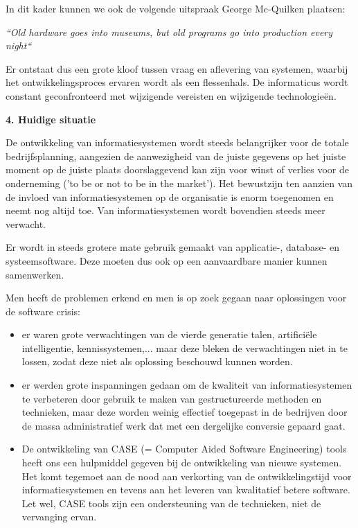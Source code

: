 In dit kader kunnen we ook de volgende uitspraak George Mc-Quilken plaatsen:

\textit{\textquotedblleft Old hardware goes into museums, but old programs go into production every night\textquotedblleft}

Er ontstaat dus een grote kloof tussen vraag en aflevering van systemen, waarbij het ontwikkelingsproces ervaren wordt als een flessenhals. De informaticus wordt constant geconfronteerd met wijzigende vereisten en wijzigende technologieën.

\textbf{4. Huidige situatie}

De ontwikkeling van informatiesystemen wordt steeds belangrijker voor de totale bedrijfsplanning, aangezien de aanwezigheid van de juiste gegevens op het juiste moment op de juiste plaats doorslaggevend kan zijn voor winst of verlies voor de onderneming ('to be or not to be in the market').
Het bewustzijn ten aanzien van de invloed van informatiesystemen op de organisatie is enorm toegenomen en neemt nog altijd toe. Van informatiesystemen wordt bovendien steeds meer verwacht.

Er wordt in steeds grotere mate gebruik gemaakt van applicatie-, database- en systeemsoftware. Deze moeten dus ook op een aanvaardbare manier kunnen samenwerken.

Men heeft de problemen erkend en men is op zoek gegaan naar oplossingen voor de software crisis:

\begin{itemize}
    \item er waren grote verwachtingen van de vierde generatie talen, artificiële intelligentie, kennissystemen,... maar deze bleken de verwachtingen niet in te lossen, zodat deze niet als oplossing beschouwd kunnen worden.
    \item er werden grote inspanningen gedaan om de kwaliteit van informatiesystemen te verbeteren door gebruik te maken van gestructureerde methoden en technieken, maar deze worden weinig effectief toegepast in de bedrijven door de massa administratief werk dat met een dergelijke conversie gepaard gaat.
    \item De ontwikkeling van CASE (= Computer Aided Software Engineering) tools heeft ons een hulpmiddel gegeven bij de ontwikkeling van nieuwe systemen. Het komt tegemoet aan de nood aan verkorting van de
ontwikkelingstijd voor informatiesystemen en tevens aan het leveren van kwalitatief betere software. Let wel, CASE tools zijn een ondersteuning van de technieken, niet de vervanging ervan.
\end{itemize}

